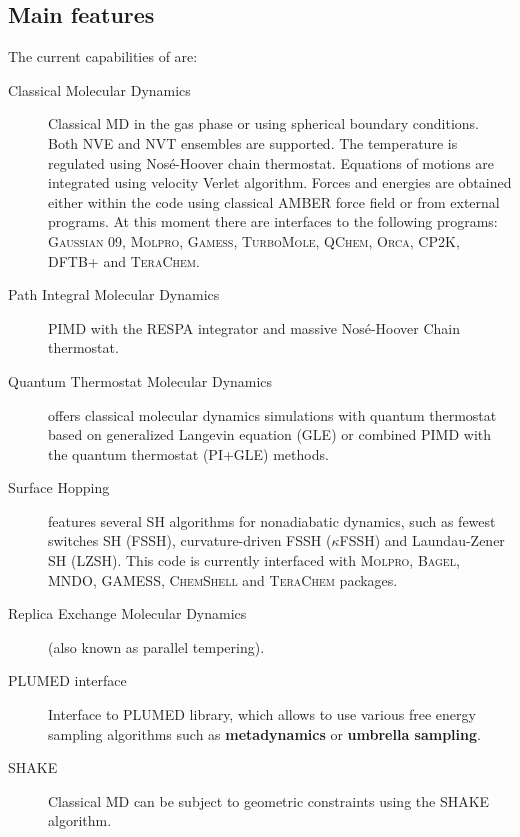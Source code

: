 \subsection{Main features}
The current capabilities of \abin are:
\begin{description}
    \item[Classical Molecular Dynamics] Classical MD in the gas phase or using spherical boundary conditions. Both NVE and NVT ensembles are supported. The temperature is regulated using Nosé-Hoover chain thermostat\cite{Martyna1992a}. Equations of motions are integrated using velocity Verlet algorithm. Forces and energies are obtained either within the code using classical AMBER force field or from external programs. At this moment there are interfaces to the following programs: \textsc{Gaussian 09\cite{G09}}, \textsc{Molpro}\cite{MOLPRO06}, \textsc{Gamess}\cite{Schmidt1993}, \textsc{TurboMole}\cite{turbomole}, \textsc{QChem}\cite{Shao2006}, \textsc{Orca}\cite{Neese2012}, \textsc{CP2K}\cite{Hutter2014}, \textsc{DFTB+} and \textsc{TeraChem}\cite{Ufimtsev2008}. 

    \item[Path Integral Molecular Dynamics] PIMD with the RESPA integrator and massive Nosé-Hoover Chain thermostat.

    \item[Quantum Thermostat Molecular Dynamics] \abin offers classical molecular dynamics simulations with quantum thermostat based on generalized Langevin equation (GLE)\cite{Ceriotti2010d} or combined PIMD with the quantum thermostat (PI+GLE)\cite{Ceriotti2011} methods.

    \item[Surface Hopping] \abin features several SH algorithms for nonadiabatic dynamics, such as fewest switches SH (FSSH)\cite{Barbatti2011}, curvature-driven FSSH ($\kappa$FSSH)\cite{Jira2025} and Laundau-Zener SH (LZSH)\cite{SuchanLZ}. 
    This code is currently interfaced with \textsc{Molpro}, \textsc{Bagel}, \textsc{MNDO}, \textsc{GAMESS, \textsc{ChemShell}} and \textsc{TeraChem} packages. 

    \item[Replica Exchange Molecular Dynamics] (also known as parallel tempering).

    \item[PLUMED interface] Interface to PLUMED library, which allows to use various free energy sampling algorithms such as \textbf{metadynamics} or \textbf{umbrella sampling}.

    \item[SHAKE] Classical MD can be subject to geometric constraints using the SHAKE algorithm.

\end{description}


